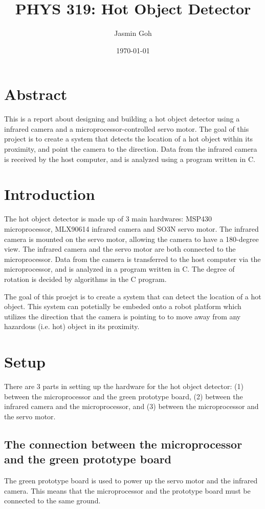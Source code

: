 \documentclass[12pt]{article}
\title{PHYS 319: Hot Object Detector}
\author{Jasmin Goh}
\date{\today}
\begin{document}
\maketitle

\section {Abstract}
This is a report about designing and building a hot object detector using a infrared camera and a microprocessor-controlled servo motor. The goal of this project is to create a system that detects the location of a hot object within its proximity, and point the camera to the direction. Data from the infrared camera is received by the host computer, and is analyzed using a program written in C.

\section {Introduction}
The hot object detector is made up of 3 main hardwares: MSP430 microprocessor, MLX90614 infrared camera and SO3N servo motor. The infrared camera is mounted on the servo motor, allowing the camera to have a 180-degree view. The infrared camera and the servo motor are both connected to the microprocessor. Data from the camera is transferred to the host computer via the microprocessor, and is analyzed in a program written in C. The degree of rotation is decided by algorithms in the C program.

The goal of this proejct is to create a system that can detect the location of a hot object. This system can potetially be embeded onto a robot platform which utilizes the direction that the camera is pointing to to move away from any hazardous (i.e. hot) object in its proximity.

\section {Setup}
There are 3 parts in setting up the hardware for the hot object detector: (1) between the microprocessor and the green prototype board, (2) between the infrared camera and the microprocessor, and (3) between the microprocessor and the servo motor.

\subsection {The connection between the microprocessor and the green prototype board}
The green prototype board is used to power up the servo motor and the infrared camera. This means that the microprocessor and the prototype board must be connected to the same ground. 
\end{document}
